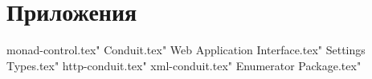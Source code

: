 \part*{Приложения}

\appendix

 monad-control.tex"
 Conduit.tex"
 Web Application Interface.tex"
 Settings Types.tex"
 http-conduit.tex"
 xml-conduit.tex"
 Enumerator Package.tex"

